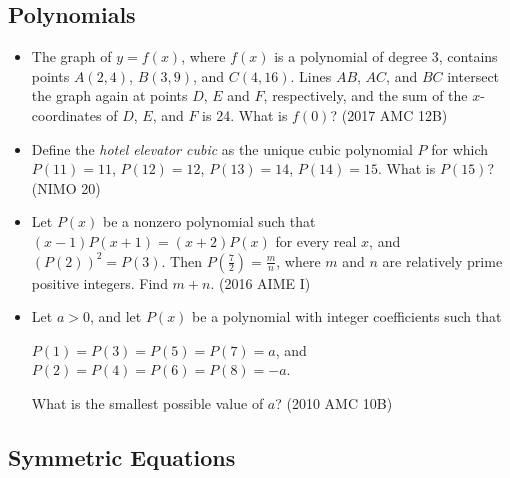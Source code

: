 \documentclass{article}
\begin{document}
\subsection{Polynomials}

\begin{itemize}

\item The graph of $y=f(x)$, where $f(x)$ is a polynomial of degree 3, contains points $A(2,4)$, $B(3,9)$, and $C(4,16)$. Lines $AB$, $AC$, and $BC$ intersect the graph again at points $D$, $E$ and $F$, respectively, and the sum of the $x$-coordinates of $D$, $E$, and $F$ is 24. What is $f(0)$? (2017 AMC 12B)

\item Define the \emph{hotel elevator cubic} as the unique cubic polynomial $P$ for which $P(11)=11$, $P(12)=12$, $P(13)=14$, $P(14)=15$. What is $P(15)$? (NIMO 20)

\item Let $P(x)$ be a nonzero polynomial such that $(x-1)P(x+1)=(x+2)P(x)$ for every real $x$, and $\left(P(2)\right)^2 = P(3)$. Then $P(\tfrac72)=\tfrac{m}{n}$, where $m$ and $n$ are relatively prime positive integers. Find $m + n$. (2016 AIME I)

\item Let $a > 0$, and let $P(x)$ be a polynomial with integer coefficients such that

\begin{center}
$P(1) = P(3) = P(5) = P(7) = a$, and \\
$P(2) = P(4) = P(6) = P(8) = -a$.
\end{center}

What is the smallest possible value of $a$? (2010 AMC 10B)

\end{itemize}



\subsection{Symmetric Equations}
\end{document}
